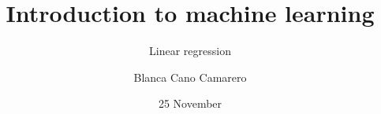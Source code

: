 
\title{Introduction to machine learning} %

\subtitle{Linear regression} %

\author[Blanca Cano Camarero]{Blanca Cano Camarero} %


\date{25 November} %

